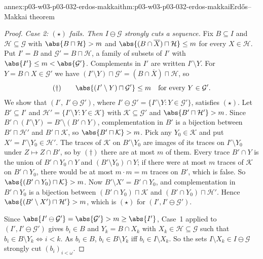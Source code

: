 \begin{annexitem}{annex:p03-w03-p03-032-erdos-makkai}{thm:p03-w03-p03-032-erdos-makkai}{Erd\H{o}s--Makkai theorem}
\begin{proof}
\emph{Case 2: \((\star)\) fails.  Then \(I\ominus\mathcal G\) strongly cuts a
sequence.}  Fix \(B\subseteq I\) and \(\mathcal H\subseteq\mathcal G\) with
\(\abs{B\sqcap\mathcal H}>m\) and
\(\abs{(B\cap\overline X)\sqcap\mathcal H}\leq m\) for every
\(X\in\mathcal H\).  Put \(I'=B\) and \(\mathcal G'=B\sqcap\mathcal H\), a
family of subsets of \(I'\) with \(\abs{I'}\leq m<\abs{\mathcal G'}\).
Complements in \(I'\) are written \(I'\setminus Y\).  For
\(Y=B\cap X\in\mathcal G'\) we have
\((I'\setminus Y)\sqcap\mathcal G'=(B\cap\overline X)\sqcap\mathcal H\), so
\begin{equation*}
  (\dagger)\qquad \abs{(I'\setminus Y)\sqcap\mathcal G'}\leq m
  \quad\text{for every }Y\in\mathcal G' .
\end{equation*}
We show that \((I',\ I'\ominus\mathcal G')\), where
\(I'\ominus\mathcal G'=\{I'\setminus Y:Y\in\mathcal G'\}\), satisfies
\((\star)\).  Let \(B'\subseteq I'\) and
\(\mathcal H'=\{I'\setminus Y:Y\in\mathcal K\}\) with
\(\mathcal K\subseteq\mathcal G'\) and \(\abs{B'\sqcap\mathcal H'}>m\).
Since \(B'\cap(I'\setminus Y)=B'\setminus(B'\cap Y)\), complementation in
\(B'\) is a bijection between \(B'\sqcap\mathcal H'\) and
\(B'\sqcap\mathcal K\), so \(\abs{B'\sqcap\mathcal K}>m\).  Pick any
\(Y_0\in\mathcal K\) and put \(X'=I'\setminus Y_0\in\mathcal H'\).  The
traces of \(\mathcal K\) on \(B'\setminus Y_0\) are images of its traces on
\(I'\setminus Y_0\) under \(Z\mapsto Z\cap B'\), so by \((\dagger)\) there are
at most \(m\) of them.  Every trace \(B'\cap Y\) is the union of
\(B'\cap Y_0\cap Y\) and \((B'\setminus Y_0)\cap Y\); if there were at most
\(m\) traces of \(\mathcal K\) on \(B'\cap Y_0\), there would be at most
\(m\cdot m=m\) traces on \(B'\), which is false.  So
\(\abs{(B'\cap Y_0)\sqcap\mathcal K}>m\).  Now \(B'\setminus X'=B'\cap Y_0\),
and complementation in \(B'\cap Y_0\) is a bijection between
\((B'\cap Y_0)\sqcap\mathcal K\) and \((B'\cap Y_0)\sqcap\mathcal H'\).  Hence
\(\abs{(B'\setminus X')\sqcap\mathcal H'}>m\), which is \((\star)\) for
\((I',I'\ominus\mathcal G')\).

Since \(\abs{I'\ominus\mathcal G'}=\abs{\mathcal G'}>m\geq\abs{I'}\), Case~1
applied to \((I',I'\ominus\mathcal G')\) gives \(b_i\in B\) and
\(Y_k=B\cap X_k\) with \(X_k\in\mathcal H\subseteq\mathcal G\) such that
\(b_i\in B\setminus Y_k\Leftrightarrow i<k\).  As \(b_i\in B\),
\(b_i\in B\setminus Y_k\) iff \(b_i\in I\setminus X_k\).  So the sets
\(I\setminus X_k\in I\ominus\mathcal G\) strongly cut \((b_i)_{i<\omega}\).
\end{proof}
\end{annexitem}

